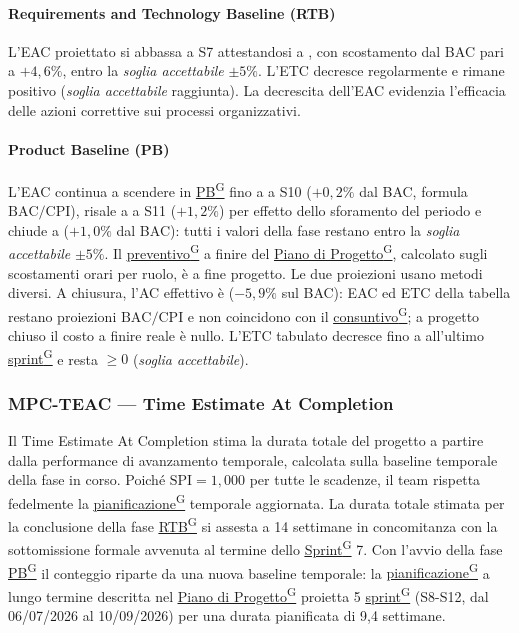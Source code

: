 \documentclass[a4paper,12pt]{article}
\providecommand{\glslink}[2]{\href{https://alittlebyte-19.github.io/Documentazione/glossario.html\#gls-#1}{\underline{#2}\textsuperscript{\scriptsize G}}}
\begin{document}
\paragraph*{Requirements and Technology Baseline (RTB)} L'EAC proiettato si abbassa a S7 attestandosi a , con scostamento dal BAC pari a $+4{,}6\%$, entro la \emph{soglia accettabile} $\pm 5\%$. L'ETC decresce regolarmente e rimane positivo (\emph{soglia accettabile} raggiunta). La decrescita dell'EAC evidenzia l'efficacia delle azioni correttive sui processi organizzativi.

\paragraph*{Product Baseline (PB)} L'EAC continua a scendere in \glslink{pb-product-baseline}{PB} fino a  a S10 ($+0{,}2\%$ dal BAC, formula $\text{BAC}/\text{CPI}$), risale a  a S11 ($+1{,}2\%$) per effetto dello sforamento del periodo e chiude a  ($+1{,}0\%$ dal BAC): tutti i valori della fase restano entro la \emph{soglia accettabile} $\pm 5\%$. Il \glslink{preventivo}{preventivo} a finire del \glslink{piano-di-progetto}{Piano di Progetto}, calcolato sugli scostamenti orari per ruolo, è  a fine progetto. Le due proiezioni usano metodi diversi. A chiusura, l'AC effettivo è  ($-5{,}9\%$ sul BAC): EAC ed ETC della tabella restano proiezioni $\text{BAC}/\text{CPI}$ e non coincidono con il \glslink{consuntivo}{consuntivo}; a progetto chiuso il costo a finire reale è nullo. L'ETC tabulato decresce fino a  all'ultimo \glslink{sprint}{sprint} e resta $\geq 0$ (\emph{soglia accettabile}).

\subsubsection{MPC-TEAC — Time Estimate At Completion}

Il Time Estimate At Completion stima la durata totale del progetto a partire dalla performance di avanzamento temporale, calcolata sulla baseline temporale della fase in corso. Poiché $\text{SPI} = 1{,}000$ per tutte le scadenze, il team rispetta fedelmente la \glslink{pianificazione}{pianificazione} temporale aggiornata. La durata totale stimata per la conclusione della fase \glslink{rtb-requirements-and-technology-baseline}{RTB} si assesta a 14 settimane in concomitanza con la sottomissione formale avvenuta al termine dello \glslink{sprint}{Sprint} 7. Con l'avvio della fase \glslink{pb-product-baseline}{PB} il conteggio riparte da una nuova baseline temporale: la \glslink{pianificazione}{pianificazione} a lungo termine descritta nel \glslink{piano-di-progetto}{Piano di Progetto} proietta 5 \glslink{sprint}{sprint} (S8-S12, dal 06/07/2026 al 10/09/2026) per una durata pianificata di 9,4 settimane.
\end{document}
